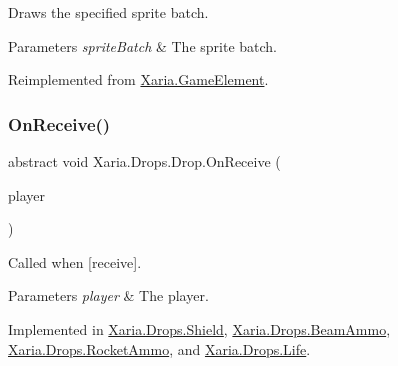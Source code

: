 Draws the specified sprite batch. 


\begin{DoxyParams}{Parameters}
{\em sprite\+Batch} & The sprite batch.\\
\hline
\end{DoxyParams}


Reimplemented from \hyperlink{classXaria_1_1GameElement_a812e0ffbe54519a3fb14a49115bf43d9}{Xaria.\+Game\+Element}.

\mbox{\label{classXaria_1_1Drops_1_1Drop_abb5544bb56ff889f557888bd9e86f7cb}} 
\subsubsection{\texorpdfstring{On\+Receive()}{OnReceive()}}
{\footnotesize\ttfamily abstract void Xaria.\+Drops.\+Drop.\+On\+Receive (\begin{DoxyParamCaption}\item[{ref \hyperlink{classXaria_1_1Player}{Player}}]{player }\end{DoxyParamCaption})\hspace{0.3cm}{\ttfamily [pure virtual]}}



Called when \mbox{[}receive\mbox{]}. 


\begin{DoxyParams}{Parameters}
{\em player} & The player.\\
\hline
\end{DoxyParams}


Implemented in \hyperlink{classXaria_1_1Drops_1_1Shield_a8c222c24381f32eab822d004c734aafd}{Xaria.\+Drops.\+Shield}, \hyperlink{classXaria_1_1Drops_1_1BeamAmmo_aa7141e1cf73e97b303871d0db8576811}{Xaria.\+Drops.\+Beam\+Ammo}, \hyperlink{classXaria_1_1Drops_1_1RocketAmmo_a5a860b6a2c037fa5f24416cf9296055d}{Xaria.\+Drops.\+Rocket\+Ammo}, and \hyperlink{classXaria_1_1Drops_1_1Life_a17d0f9af39944213da726d821a46555b}{Xaria.\+Drops.\+Life}.

\mbox{\label{classXaria_1_1Drops_1_1Drop_abe25441e5c3fe5b2199352f24bfafa4b}} 
